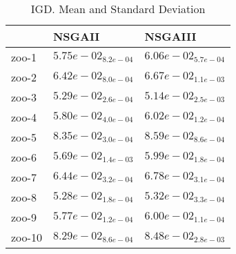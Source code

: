 \documentclass{article}
\begin{document}
\begin{table}
\caption{IGD. Mean and Standard Deviation}
\label{table: IGD}
\centering
\begin{scriptsize}
\begin{tabular}{lll}
\hline & NSGAII &  NSGAIII\\
\hline 
zoo-1 & \cellcolor{gray95}$  5.75e-02_{ 8.2e-04}$ & \cellcolor{gray25}$  6.06e-02_{ 5.7e-04}$ \\
zoo-2 & \cellcolor{gray95}$  6.42e-02_{ 8.0e-04}$ & \cellcolor{gray25}$  6.67e-02_{ 1.1e-03}$ \\
zoo-3 & \cellcolor{gray25}$  5.29e-02_{ 2.6e-04}$ & \cellcolor{gray95}$  5.14e-02_{ 2.5e-03}$ \\
zoo-4 & \cellcolor{gray95}$  5.80e-02_{ 4.0e-04}$ & \cellcolor{gray25}$  6.02e-02_{ 1.2e-04}$ \\
zoo-5 & \cellcolor{gray95}$  8.35e-02_{ 3.0e-04}$ & \cellcolor{gray25}$  8.59e-02_{ 8.6e-04}$ \\
zoo-6 & \cellcolor{gray95}$  5.69e-02_{ 1.4e-03}$ & \cellcolor{gray25}$  5.99e-02_{ 1.8e-04}$ \\
zoo-7 & \cellcolor{gray95}$  6.44e-02_{ 3.2e-04}$ & \cellcolor{gray25}$  6.78e-02_{ 3.1e-04}$ \\
zoo-8 & \cellcolor{gray95}$  5.28e-02_{ 1.8e-04}$ & \cellcolor{gray25}$  5.32e-02_{ 3.3e-04}$ \\
zoo-9 & \cellcolor{gray95}$  5.77e-02_{ 1.2e-04}$ & \cellcolor{gray25}$  6.00e-02_{ 1.1e-04}$ \\
zoo-10 & \cellcolor{gray95}$  8.29e-02_{ 8.6e-04}$ & \cellcolor{gray25}$  8.48e-02_{ 2.8e-03}$ \\
\hline
\end{tabular}
\end{scriptsize}
\end{table}
\end{document}
